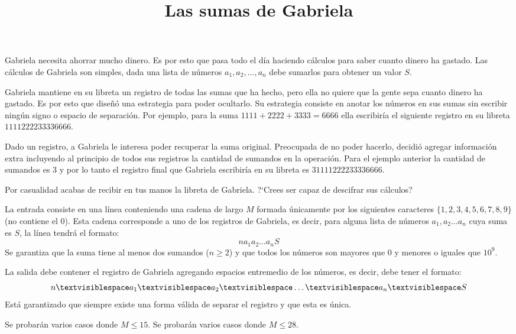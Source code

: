 \documentclass{oci}
\title{Las sumas de Gabriela}
\begin{document}
\begin{problemDescription}
Gabriela necesita ahorrar mucho dinero.
Es por esto que pasa todo el día haciendo cálculos para saber cuanto dinero
ha gastado.
Las cálculos de Gabriela son simples, dada una lista de números $a_1, a_2,
\dots, a_n$ debe sumarlos para obtener un valor $S$.

Gabriela mantiene en su libreta un registro de todas las sumas que ha hecho,
pero ella no quiere que la gente sepa cuanto dinero ha gastado.
Es por esto que diseñó una estrategia para poder ocultarlo.
Su estrategia consiste en anotar los números en sus sumas sin escribir
ningún signo o espacio de separación.
Por ejemplo, para la suma $1111+2222+3333=6666$ ella escribiría el siguiente
registro en su libreta $1111222233336666$.

Dado un registro, a Gabriela le interesa poder recuperar la suma original.
Preocupada de no poder hacerlo, decidió agregar información extra incluyendo al
principio de todos sus registros la cantidad de sumandos en la operación.
Para el ejemplo anterior la cantidad de sumandos es $3$ y por lo tanto el
registro final que Gabriela escribiría en su libreta es $31111222233336666$.

Por casualidad acabas de recibir en tus manos la libreta de Gabriela.
?`Crees ser capaz de descifrar sus cálculos?
\end{problemDescription}

\begin{inputDescription}
La entrada consiste en una línea conteniendo una cadena de largo $M$ formada
únicamente por los siguientes caracteres $\{1,2,3,4,5,6,7,8,9\}$ (no contiene el
$0$).
Esta cadena corresponde a uno de los registros de Gabriela, es decir, para
alguna lista de números $a_1,a_2\dots a_n$ cuya suma es $S$, la línea tendrá el
formato:
$$n a_1 a_2 \dots a_nS$$
Se garantiza que la suma tiene al menos dos sumandos ($n\geq 2$) y que todos los
números son mayores que 0 y menores o iguales que $10^9$.
\end{inputDescription}

\begin{outputDescription}
La salida debe contener el registro de Gabriela agregando espacios 
entremedio de los números, es decir, debe tener el formato:
$$n\textvisiblespace a_1\textvisiblespace a_2\textvisiblespace
\dots\textvisiblespace a_n\textvisiblespace S$$
Está garantizado que siempre existe una forma válida de separar el registro y que
esta es única.
\end{outputDescription}

\begin{scoreDescription}
   Se probarán varios casos donde $M\leq 15$.
   Se probarán varios casos donde $M\leq 28$.
\end{scoreDescription}

\begin{sampleDescription}
\end{sampleDescription}
\end{document}
